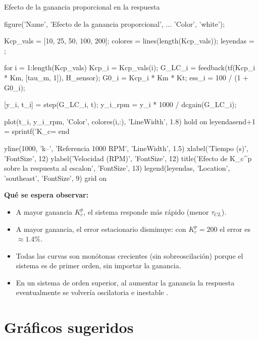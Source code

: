 \begin{matlabcodetitulo}{Efecto de la ganancia proporcional en la respuesta}

figure('Name', 'Efecto de la ganancia proporcional', ...
       'Color', 'white');

Kcp_vals = [10, 25, 50, 100, 200];
colores = lines(length(Kcp_vals));
leyendas = {};

for i = 1:length(Kcp_vals)
    Kcp_i = Kcp_vals(i);
    G_LC_i = feedback(tf(Kcp_i * Km, [tau_m, 1]), H_sensor);
    G0_i   = Kcp_i * Km * Kt;
    ess_i  = 100 / (1 + G0_i);    %

    [y_i, t_i] = step(G_LC_i, t);
    y_i_rpm = y_i * 1000 / dcgain(G_LC_i);  %

    plot(t_i, y_i_rpm, 'Color', colores(i,:), 'LineWidth', 1.8)
    hold on
    leyendas{end+1} = sprintf('K_c=%
end

yline(1000, 'k--', 'Referencia 1000 RPM', 'LineWidth', 1.5)
xlabel('Tiempo (s)', 'FontSize', 12)
ylabel('Velocidad (RPM)', 'FontSize', 12)
title('Efecto de K_c^p sobre la respuesta al escalon', 'FontSize', 13)
legend(leyendas, 'Location', 'southeast', 'FontSize', 9)
grid on
\end{matlabcodetitulo}

\textbf{Qué se espera observar:}
\begin{itemize}
  \item A mayor ganancia $K_c^p$, el sistema responde más rápido (menor $\tau_{CL}$).
  \item A mayor ganancia, el error estacionario disminuye: con $K_c^p = 200$
    el error es $\approx 1.4\%$.
  \item Todas las curvas son monótonas crecientes (sin sobreoscilación) porque
    el sistema es de primer orden, sin importar la ganancia.
  \item En un sistema de orden superior, al aumentar la ganancia la respuesta
    eventualmente se volvería oscilatoria e inestable .
\end{itemize}

\section{Gráficos sugeridos}
\label{sec:intro-graficos}

